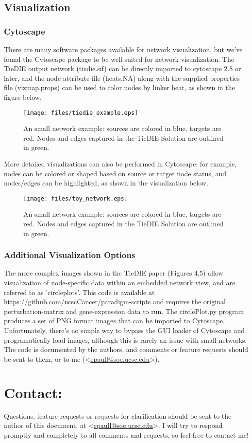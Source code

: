\documentclass[11pt]{report}
\newcommand{\emailaddr}[1]{\textless\url{#1}\textgreater}
\begin{document}
\section{Visualization}

\subsection{Cytoscape}

\noindent There are many software packages available for network visualization, but we've found the Cytoscape package \cite{Cytoscape03} to be well suited for network visualization. The TieDIE output network (tiedie.sif) can be directly imported to cytoscape 2.8 or later, and the node attribute file (heats.NA) along with the supplied properties file (vizmap.props) can be used to color nodes by linker heat, as shown in the figure below.

\begin{figure}[h]
    \texttt{[image: files/tiedie\_example.eps]}
	\caption{An small network example: sources are colored in blue, targets are red. Nodes and edges captured in the TieDIE Solution are outlined in green.}
    \label{fig:toy_network}
\end{figure}

\clearpage

More detailed visualizations can also be performed in Cytoscape: for example, nodes can be colored or shaped based on source or
target node status, and nodes/edges can be highlighted, as shown in the visualization below. 

\begin{figure}[h]
    \texttt{[image: files/toy\_network.eps]}
	\caption{An small network example: sources are colored in blue, targets are red. Nodes and edges captured in the TieDIE Solution are outlined in green.}
    \label{fig:toy_network}
\end{figure}

\clearpage

\subsection{Additional Visualization Options}

The more complex images shown in the TieDIE paper (Figures 4,5) allow visualization of node-specific data within an embedded network view, 
and are referred to as 'circleplots'. 
This code is available at \url{https://github.com/ucscCancer/paradigm-scripts} and requires the original perturbation-matrix and gene-expression data to run. The circlePlot.py program produces a set of PNG format images that can be imported to Cytoscape. Unfortunately, there's no simple way to bypass the GUI loader of Cytoscape and programatically load images, although this is rarely an issue with small networks. The code is documented by the authors, and comments or feature requests should be sent to them, or to me (\emailaddr{epaull@soe.ucsc.edu}). 

\chapter{Contact:}

Questions, feature requests or requests for clarification should be sent to the author of this document, at \emailaddr{epaull@soe.ucsc.edu}. I will try to respond promptly and completely to all comments and requests, so feel free to contact me!
 

\end{document}
